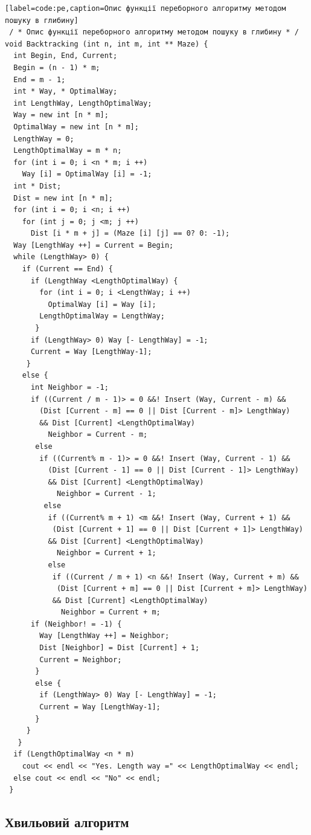 \begin{lstlisting}
[label=code:pe,caption=Опис функції переборного алгоритму методом пошуку в глибину]
 / * Опис функції переборного алгоритму методом пошуку в глибину * /
void Backtracking (int n, int m, int ** Maze) {
  int Begin, End, Current;
  Begin = (n - 1) * m;
  End = m - 1;
  int * Way, * OptimalWay;
  int LengthWay, LengthOptimalWay;
  Way = new int [n * m];
  OptimalWay = new int [n * m];
  LengthWay = 0;
  LengthOptimalWay = m * n;
  for (int i = 0; i <n * m; i ++)
    Way [i] = OptimalWay [i] = -1;
  int * Dist;
  Dist = new int [n * m];
  for (int i = 0; i <n; i ++)
    for (int j = 0; j <m; j ++)
      Dist [i * m + j] = (Maze [i] [j] == 0? 0: -1);
  Way [LengthWay ++] = Current = Begin;
  while (LengthWay> 0) {
    if (Current == End) {
      if (LengthWay <LengthOptimalWay) {
        for (int i = 0; i <LengthWay; i ++)
          OptimalWay [i] = Way [i];
        LengthOptimalWay = LengthWay;
       }
      if (LengthWay> 0) Way [- LengthWay] = -1;
      Current = Way [LengthWay-1];
     }
    else {
      int Neighbor = -1;
      if ((Current / m - 1)> = 0 &&! Insert (Way, Current - m) &&
        (Dist [Current - m] == 0 || Dist [Current - m]> LengthWay)
        && Dist [Current] <LengthOptimalWay)
          Neighbor = Current - m;
       else 
        if ((Current% m - 1)> = 0 &&! Insert (Way, Current - 1) &&
          (Dist [Current - 1] == 0 || Dist [Current - 1]> LengthWay)
          && Dist [Current] <LengthOptimalWay)
            Neighbor = Current - 1;
         else 
          if ((Current% m + 1) <m &&! Insert (Way, Current + 1) &&
           (Dist [Current + 1] == 0 || Dist [Current + 1]> LengthWay)
          && Dist [Current] <LengthOptimalWay)
            Neighbor = Current + 1;
          else 
           if ((Current / m + 1) <n &&! Insert (Way, Current + m) &&
            (Dist [Current + m] == 0 || Dist [Current + m]> LengthWay)
           && Dist [Current] <LengthOptimalWay)
             Neighbor = Current + m;
      if (Neighbor! = -1) {
        Way [LengthWay ++] = Neighbor;
        Dist [Neighbor] = Dist [Current] + 1;
        Current = Neighbor;
       }
       else {
        if (LengthWay> 0) Way [- LengthWay] = -1;
        Current = Way [LengthWay-1];
       }
     }
   }
  if (LengthOptimalWay <n * m) 
    cout << endl << "Yes. Length way =" << LengthOptimalWay << endl;
  else cout << endl << "No" << endl;
 } 
\end{lstlisting}


\subsection{Хвильовий алгоритм}

